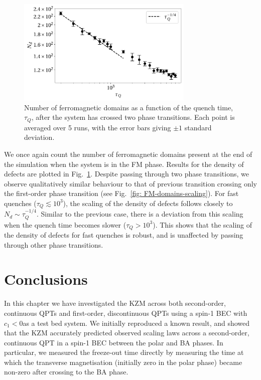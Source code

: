 \begin{figure}
    \centering
    \includegraphics[width=0.75\textwidth]{gfx/ch-spin1/polar-BA-FM_domains.pdf}
    \caption{\label{fig: polar-ba-fm-defects}Number of ferromagnetic domains as
    a function of the quench time, \(\tau_Q\), after the system has crossed two
    phase transitions.
    Each point is averaged over 5 runs, with the error bars giving \(\pm 1\)
    standard deviation.}
\end{figure}
We once again count the number of ferromagnetic domains present at the end of
the simulation when the system is in the FM phase.
Results for the density of defects are plotted in
Fig.~\ref{fig: polar-ba-fm-defects}.
Despite passing through two phase transitions, we observe qualitatively similar
behaviour to that of previous transition crossing only the first-order phase
transition (see Fig.~\ref{fig: FM-domains-scaling}).
For fast quenches (\(\tau_Q \lesssim 10^3 \)), the scaling of the density of
defects follows closely to \(N_d \sim \tau_Q^{-1/4}\).
Similar to the previous case, there is a deviation from this scaling when the
quench time becomes slower (\(\tau_Q > 10^3\)).
This shows that the scaling of the density of defects for fast quenches is
robust, and is unaffected by passing through other phase transitions.

\section{Conclusions}
In this chapter we have investigated the KZM across both second-order,
continuous QPTs and first-order, discontinuous QPTs using a spin-1 BEC with
\(c_1 < 0\)as a test bed system.
We initially reproduced a known result, and showed that the KZM accurately
predicted observed scaling laws across a second-order, continuous QPT in a
spin-1 BEC between the polar and BA phases.
In particular, we measured the freeze-out time directly by measuring the time at
which the transverse magnetisation (initially zero in the polar phase) became
non-zero after crossing to the BA phase.

